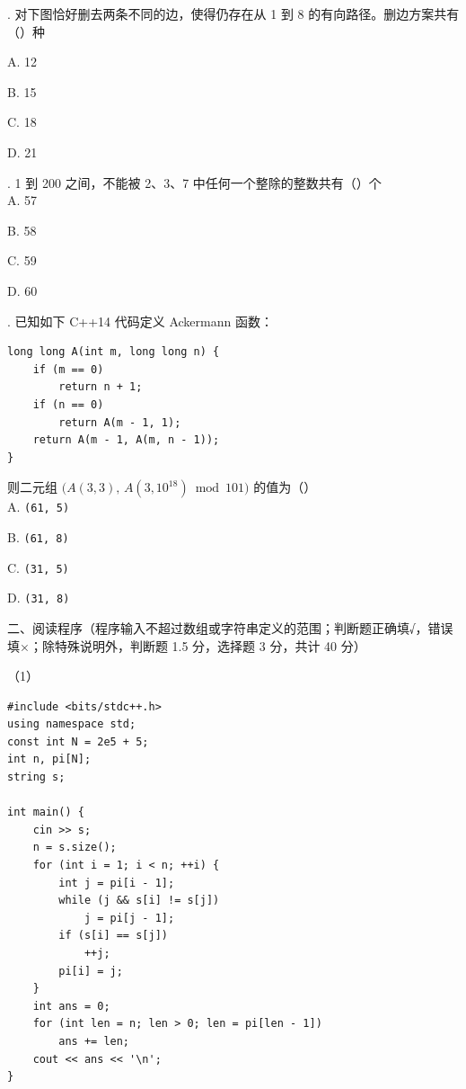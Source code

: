 \documentclass[a4paper]{ctexart}
\newcommand{\bigtitle}[1]{\noindent\heiti #1\par\vspace{2pt}}
\newcommand{\q}[1]{\noindent #1}
\newcommand{\opt}[1]{\hspace*{2em} #1\par}
\begin{document}
\q{13.} 对下图恰好删去两条不同的边，使得仍存在从 1 到 8 的有向路径。删边方案共有（\qquad）种
\begin{center}
\end{center}
\opt{A. 12}\opt{B. 15}\opt{C. 18}\opt{D. 21}

\q{14.} 1 到 200 之间，不能被 2、3、7 中任何一个整除的整数共有（\qquad）个\\
\opt{A. 57}\opt{B. 58}\opt{C. 59}\opt{D. 60}
\q{15.} 已知如下 C++14 代码定义 Ackermann 函数：
\begin{codebox}\begin{lstlisting}
long long A(int m, long long n) {
    if (m == 0)
        return n + 1;
    if (n == 0)
        return A(m - 1, 1);
    return A(m - 1, A(m, n - 1));
}
\end{lstlisting}\end{codebox}
则二元组 \(\bigl(A(3,3),\,A(3,10^{18})\bmod 101\bigr)\) 的值为（\qquad）\\
\opt{A. \texttt{(61, 5)}}\opt{B. \texttt{(61, 8)}}
\opt{C. \texttt{(31, 5)}}\opt{D. \texttt{(31, 8)}}

\clearpage
\bigtitle{二、阅读程序（程序输入不超过数组或字符串定义的范围；判断题正确填√，错误填×；除特殊说明外，判断题 1.5 分，选择题 3 分，共计 40 分）}

\noindent（1）
\begin{codebox}\begin{lstlisting}
#include <bits/stdc++.h>
using namespace std;
const int N = 2e5 + 5;
int n, pi[N];
string s;

int main() {
    cin >> s;
    n = s.size();
    for (int i = 1; i < n; ++i) {
        int j = pi[i - 1];
        while (j && s[i] != s[j])
            j = pi[j - 1];
        if (s[i] == s[j])
            ++j;
        pi[i] = j;
    }
    int ans = 0;
    for (int len = n; len > 0; len = pi[len - 1])
        ans += len;
    cout << ans << '\n';
}
\end{lstlisting}\end{codebox}
\end{document}
